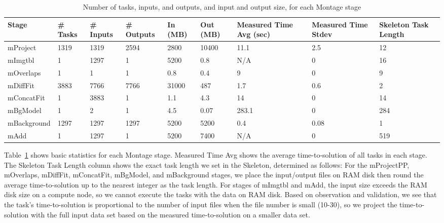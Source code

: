 \documentclass{sig-alternate}
\newcommand{\up}{\vspace*{-1em}}
\newcommand{\zhaonote}[1]{{\textcolor{darkgreen}    { ***Zhao:      #1 }}}
\newcommand{\zhaonote}[1]{}
\begin{document}
\begin{table}[t]
\begin{center}
    \caption{Number of tasks, inputs, and outputs, and input and output size, for each Montage stage}
    \begin{scriptsize}
    \begin{tabular}{ | p{1.6cm} | p{1cm} | p{1cm} | p{1.2cm} | p{1cm} | p{1.25cm} | p{2cm} | p{1.5cm} | p{1.5cm} |}
    \hline
    Stage & \# Tasks & \# Inputs & \# Outputs & In (MB) & Out (MB) & Measured Time Avg (sec) & Measured Time Stdev & Skeleton Task Length\\ \hline \hline
	mProject & 1319 & 1319 & 2594 & 2800 & 10400 & 11.1 & 2.5 & 12\\ \hline
	mImgtbl & 1 & 1297 & 1 & 5200 & 0.8 & N/A & 0 & 16\\ \hline
	mOverlaps & 1 & 1 & 1 & 0.8 & 0.4 & 9 & 0 & 9\\ \hline
	mDiffFit &  3883 & 7766 & 7766 & 31000 & 487 & 1.7 & 0.6 & 2\\ \hline
	mConcatFit & 1 & 3883 & 1 & 1.1 & 4.3 & 14 & 0 & 14\\ \hline
	mBgModel & 1 & 2 & 1 & 4.5 & 0.07 & 283.1 & 0 & 284 \\ \hline
	mBackground & 1297 & 1297 & 1297 & 5200 & 5200 & 0.4 & 0.08 & 1\\ \hline
	mAdd  & 1 & 1297 & 1 & 5200 & 7400 & N/A & 0 & 519\\ \hline

    \end{tabular}
    \end{scriptsize}
    \label{tb:stats}
    \up
\end{center}   
\end{table}

Table~\ref{tb:stats} shows basic statistics for each Montage stage. Measured Time Avg shows the average time-to-solution of all tasks in each stage.  The Skeleton Task Length column  shows the exact task length we set in the Skeleton, determined as follows:  
For the mProjectPP, mOverlaps, mDiffFit, mConcatFit, mBgModel, and mBackground stages,  we place the input/output files on RAM disk then round 
the average time-to-solution up to the nearest integer as the task length. 
For stages of mImgtbl and mAdd, the input size exceeds the RAM disk size on a compute node,
so we cannot execute the tasks with the data on RAM disk. Based on observation and validation, we see that the
task's time-to-solution is proportional to the number of input files when the file number is small (10-30), so we project the
time-to-solution with the full input data set based on
the measured time-to-solution on a smaller data set. 
\end{document}
